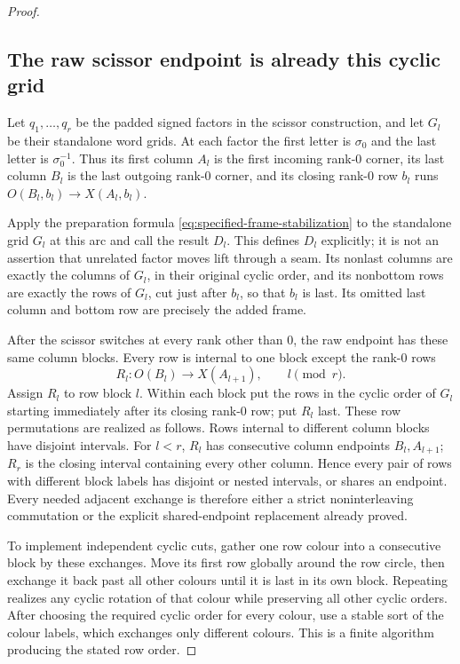\documentclass[11pt,a4paper]{article}
\theoremstyle{remark}
\begin{document}
\begin{proof}
\subsection{The raw scissor endpoint is already this cyclic grid}

Let $q_1,\ldots,q_r$ be the padded signed factors in the scissor
construction, and let $G_l$ be their standalone word grids.  At each
factor the first letter is $\sigma_0$ and the last letter is
$\sigma_0^{-1}$.  Thus its first column $A_l$ is the first incoming
rank-$0$ corner, its last column $B_l$ is the last outgoing rank-$0$
corner, and its closing rank-$0$ row $b_l$ runs
$O(B_l,b_l)\to X(A_l,b_l)$.

Apply the preparation formula
\eqref{eq:specified-frame-stabilization} to the standalone grid $G_l$
at this arc and call the result $D_l$.  This defines $D_l$ explicitly;
it is not an assertion that unrelated factor moves lift through a
seam.  Its nonlast columns are exactly the columns of $G_l$, in their
original cyclic order, and its nonbottom rows are exactly the rows of
$G_l$, cut just after $b_l$, so that $b_l$ is last.  Its omitted last
column and bottom row are precisely the added frame.

After the scissor switches at every rank other than $0$, the raw
endpoint has these same column blocks.  Every row is internal to one
block except the rank-$0$ rows
\[
 R_l:O(B_l)\longrightarrow X(A_{l+1}),
 \qquad l\pmod r.
\]
Assign $R_l$ to row block $l$.  Within each block put the rows in the
cyclic order of $G_l$ starting immediately after its closing rank-$0$
row; put $R_l$ last.  These row permutations are realized as follows.
Rows internal to different column blocks have disjoint intervals.
For $l<r$, $R_l$ has consecutive column endpoints $B_l,A_{l+1}$;
$R_r$ is the closing interval containing every other column.  Hence
every pair of rows with different block labels has disjoint or nested
intervals, or shares an endpoint.  Every needed adjacent exchange is
therefore either a strict noninterleaving commutation or the explicit
shared-endpoint replacement already proved.

To implement independent cyclic cuts, gather one row colour into a
consecutive block by these exchanges.  Move its first row globally
around the row circle, then exchange it back past all other colours
until it is last in its own block.  Repeating realizes any cyclic
rotation of that colour while preserving all other cyclic orders.
After choosing the required cyclic order for every colour, use a
stable sort of the colour labels, which exchanges only different
colours.  This is a finite algorithm producing the stated row order.


\end{proof}
\end{document}
